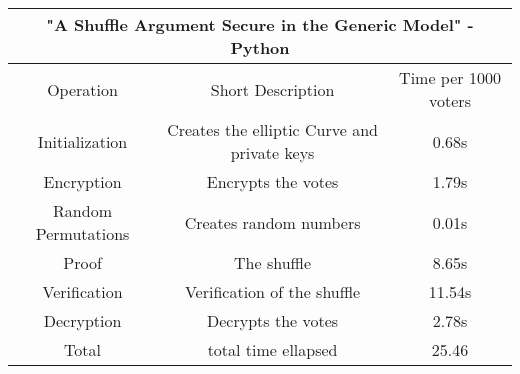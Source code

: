 \documentclass{standalone}
\begin{document}
\begin{tabular}{ |c|c|c|  }
    \hline
    \multicolumn{3}{|c|}{"A Shuffle Argument Secure in the Generic Model"
    - Python} \\
    \hline
    Operation & Short Description & Time per 1000 voters \\
    \hline
    Initialization & Creates the elliptic Curve and private keys & 0.68s \\
    Encryption & Encrypts the votes & 1.79s \\
    Random Permutations & Creates random numbers & 0.01s \\
    Proof & The shuffle & 8.65s \\
    Verification & Verification of the shuffle & 11.54s \\
    Decryption & Decrypts the votes & 2.78s \\
    Total & total time ellapsed & 25.46 \\
    \hline
\end{tabular}
\end{document}
